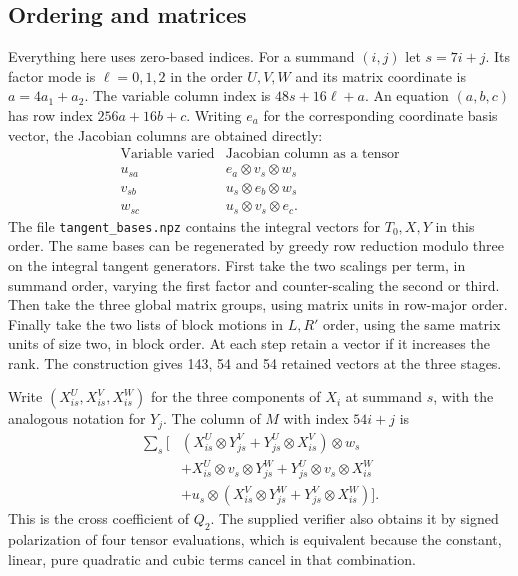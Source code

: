 \documentclass[11pt]{amsart}
\begin{document}
\subsection{Ordering and matrices}
Everything here uses zero-based indices. For a summand $(i,j)$
let $s=7i+j$. Its factor mode is $\ell=0,1,2$ in the order
$U,V,W$ and its matrix coordinate is $a=4a_1+a_2$.
The variable column index is $48s+16\ell+a$.
An equation $(a,b,c)$ has row index $256a+16b+c$.
Writing $e_a$ for the corresponding coordinate basis vector,
the Jacobian columns are obtained directly:
\[
\begin{array}{c|c}
 \text{Variable varied} & \text{Jacobian column as a tensor}\\ \hline
 u_{sa} & e_a\otimes v_s\otimes w_s\\
 v_{sb} & u_s\otimes e_b\otimes w_s\\
 w_{sc} & u_s\otimes v_s\otimes e_c .
\end{array}
\]
The file \texttt{tangent\_bases.npz} contains the integral vectors
for $T_0,X,Y$ in this order. The same bases can be regenerated
by greedy row reduction modulo three on the integral tangent
generators. First take the two scalings per term, in summand order,
varying the first factor and counter-scaling the second or third.
Then take the three global matrix groups, using matrix units in
row-major order. Finally take the two lists of block motions in
$L,R'$ order, using the same matrix units of size two, in
block order. At each step retain a vector if it increases the rank.
The construction gives 143, 54 and 54 retained vectors at the
three stages.

Write $(X^U_{is},X^V_{is},X^W_{is})$ for the three components of
$X_i$ at summand $s$, with the analogous notation for $Y_j$.
The column of $M$ with index $54i+j$ is
\begin{align*}
 \sum_s \bigl[&
 (X^U_{is}\otimes Y^V_{js}+Y^U_{js}\otimes X^V_{is})\otimes w_s\\
 &+X^U_{is}\otimes v_s\otimes Y^W_{js}
  +Y^U_{js}\otimes v_s\otimes X^W_{is}\\
 &+u_s\otimes(X^V_{is}\otimes Y^W_{js}
                 +Y^V_{js}\otimes X^W_{is})\bigr].
\end{align*}
This is the cross coefficient of $Q_2$. The supplied verifier
also obtains it by signed polarization of four tensor evaluations,
which is equivalent because the constant, linear, pure quadratic
and cubic terms cancel in that combination.
\end{document}

